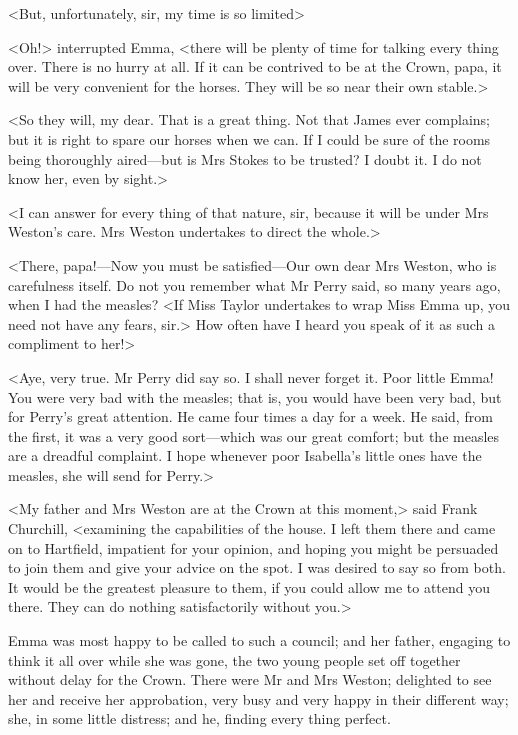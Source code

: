 <But, unfortunately, sir, my time is so limited\longdash>

<Oh!> interrupted Emma, <there will be plenty of time for talking every thing over. There is no hurry at all. If it can be contrived to be at the Crown, papa, it will be very convenient for the horses. They will be so near their own stable.>

<So they will, my dear. That is a great thing. Not that James ever complains; but it is right to spare our horses when we can. If I could be sure of the rooms being thoroughly aired—but is Mrs Stokes to be trusted? I doubt it. I do not know her, even by sight.>

<I can answer for every thing of that nature, sir, because it will be under Mrs Weston's care. Mrs Weston undertakes to direct the whole.>

<There, papa!—Now you must be satisfied—Our own dear Mrs Weston, who is carefulness itself. Do not you remember what Mr Perry said, so many years ago, when I had the measles? <If Miss Taylor undertakes to wrap Miss Emma up, you need not have any fears, sir.> How often have I heard you speak of it as such a compliment to her!>

<Aye, very true. Mr Perry did say so. I shall never forget it. Poor little Emma! You were very bad with the measles; that is, you would have been very bad, but for Perry's great attention. He came four times a day for a week. He said, from the first, it was a very good sort—which was our great comfort; but the measles are a dreadful complaint. I hope whenever poor Isabella's little ones have the measles, she will send for Perry.>

<My father and Mrs Weston are at the Crown at this moment,> said Frank Churchill, <examining the capabilities of the house. I left them there and came on to Hartfield, impatient for your opinion, and hoping you might be persuaded to join them and give your advice on the spot. I was desired to say so from both. It would be the greatest pleasure to them, if you could allow me to attend you there. They can do nothing satisfactorily without you.>

Emma was most happy to be called to such a council; and her father, engaging to think it all over while she was gone, the two young people set off together without delay for the Crown. There were Mr and Mrs Weston; delighted to see her and receive her approbation, very busy and very happy in their different way; she, in some little distress; and he, finding every thing perfect.

